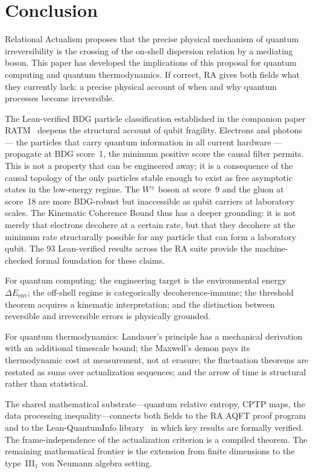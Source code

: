 \documentclass[11pt,a4paper]{article}
\theoremstyle{plain}
\theoremstyle{definition}
\theoremstyle{remark}
\begin{document}
\section{Conclusion}

Relational Actualism proposes that the precise physical mechanism of quantum
irreversibility is the crossing of the on-shell dispersion relation by a mediating
boson. This paper has developed the implications of this proposal for quantum
computing and quantum thermodynamics. If correct, RA gives both fields what they
currently lack: a precise physical account of when and why quantum processes become
irreversible.

The Lean-verified BDG particle classification established in the companion
paper RATM~\citep{Sandeman2026RATM} deepens the structural account of qubit
fragility. Electrons and photons --- the particles that carry quantum
information in all current hardware --- propagate at BDG score~1, the minimum
positive score the causal filter permits. This is not a property that can be
engineered away; it is a consequence of the causal topology of the only
particles stable enough to exist as free asymptotic states in the
low-energy regime. The $W^\pm$ boson at score~9 and the gluon at score~18
are more BDG-robust but inaccessible as qubit carriers at laboratory scales.
The Kinematic Coherence Bound thus has a deeper grounding: it is not merely
that electrons decohere at a certain rate, but that they decohere at the
minimum rate structurally possible for any particle that can form a
laboratory qubit. The 93 Lean-verified results across the RA suite
provide the machine-checked formal foundation for these claims.


For quantum computing: the engineering target is the environmental energy
$\Delta E_{\mathrm{env}}$; the off-shell regime is categorically
decoherence-immune; the threshold theorem acquires a kinematic interpretation; and
the distinction between reversible and irreversible errors is physically grounded.

For quantum thermodynamics: Landauer's principle has a mechanical derivation with
an additional timescale bound; the Maxwell's demon pays its thermodynamic cost at
measurement, not at erasure; the fluctuation theorems are restated as sums over
actualization sequences; and the arrow of time is structural rather than
statistical.

The shared mathematical substrate---quantum relative entropy, CPTP maps, the data
processing inequality---connects both fields to the RA AQFT proof program and to
the Lean-QuantumInfo library~\citep{Meiburg2025LQI} in which key results are
formally verified. The frame-independence of the actualization criterion is a
compiled theorem. The remaining mathematical frontier is the extension from finite
dimensions to the type~III$_1$ von Neumann algebra setting.
\end{document}
